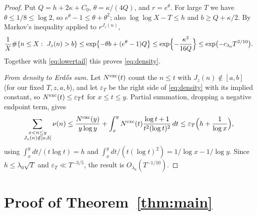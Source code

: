 \documentclass[11pt,a4paper]{article}
\numberwithin{equation}{section}
\theoremstyle{plain}
\theoremstyle{definition}
\theoremstyle{remark}
\begin{document}
\begin{proof}
Put $Q=h+2\kappa+C_0$, $\theta=\kappa/(4Q)$, and $r=e^\theta$. For large $T$ we have $\theta\le1/8\le\log2$, so $e^\theta-1\le\theta+\theta^2$; also $\log\log X-T\le h$ and $b\ge Q+\kappa/2$. By Markov's inequality applied to $r^{J_z(n)}$,
\[
\frac1X\#\{n\le X:\ J_z(n)>b\}\le\exp\bigl\{-\theta b+(e^\theta-1)Q\bigr\}\le\exp\Bigl\{-\frac{\kappa^2}{16Q}\Bigr\}\le\exp\bigl(-c_{\lambda_0}T^{3/10}\bigr).
\]
Together with \eqref{eq:lowertail} this proves \eqref{eq:density}.

\emph{From density to Erd\H{o}s sum.} Let $N^{\rm exc}(t)$ count the $n\le t$ with $J_z(n)\notin[a,b]$ (for our fixed $T,z,a,b$), and let $\varepsilon_T$ be the right side of \eqref{eq:density} with its implied constant, so $N^{\rm exc}(t)\le\varepsilon_Tt$ for $x\le t\le y$. Partial summation, dropping a negative endpoint term, gives
\[
\sum_{\substack{x<n\le y\\ J_z(n)\notin[a,b]}}\nu(n)\le\frac{N^{\rm exc}(y)}{y\log y}+\int_x^yN^{\rm exc}(t)\frac{\log t+1}{t^2(\log t)^2}\,dt\le\varepsilon_T\Bigl(h+\frac1{\log x}\Bigr),
\]
using $\int_x^y dt/(t\log t)=h$ and $\int_x^ydt/(t(\log t)^2)=1/\log x-1/\log y$. Since $h\le\lambda_0\sqrt T$ and $\varepsilon_T\ll T^{-3/5}$, the result is $O_{\lambda_0}(T^{-1/10})$.
\end{proof}

\section{Proof of Theorem~\ref{thm:main}}\label{sec:proofmain}
\end{document}
